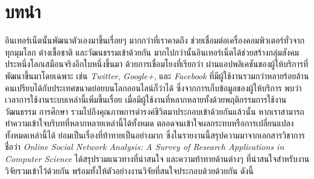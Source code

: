 \section{บทนำ}
อินเทอร์เน็ตนั้นพัฒนาตัวเองมาขึ้นเรื่อยๆ มากกว่าที่เราคาดถึง 
ช่วยเชื่อมต่อเครื่องคอมพิวเตอร์ทั่วจากทุกมุมโลก ต่างเชื้อชาติ และวัฒนธรรมเข้าด้วยกัน 
มากไปกว่านั้นอินเทอร์เน็ตได้ช่วยสร้างกลุ่มสังคมประหนึ่งโลกเสมือนจริงอีกใบหนึ่งขึ้นมา 
ด้วยการเชื่อมโยงที่เรียกว่า{\OSN} ผ่านแอปพลิเคชันของผู้ให้บริการที่พัฒนาขึ้นมาโดยเฉพาะ
เช่น \textit{Twitter}, \textit{Google+}, และ \textit{Facebook} 
ที่มีผู้ใช้งานรวมกว่าหลายร้อยล้านคนเปรียบได้กับประเทศขนาดย่อยบนโลกออนไลน์ก็ว่าได้ 
ซึ่งจากการเก็บข้อมูลของผู้ให้บริการ พบว่าเวลาการใช้งานระบบเหล่านี้เพิ่มขึ้นเรื่อย 
เมื่อมีผู้ใช้งานที่หลากหลายทั้งด้วยพฤติกรรมการใช้งาน วัฒนธรรม การศึกษา 
รวมไปถึงคุณภาพการดำรงค์ชีวิตมาประกอบเข้าด้วยกันแล้วนั้น 
หากเราสามารถทำความเข้าใจบริบทที่หลากหลายเหล่านี้ได้ทั้งหมด 
ตลอดจนเข้าใจผลกระทบหรือการเปลี่ยนแปลงทั้งหมดเหล่านี้ได้ ย่อมเป็นเรื่องที่ท้าทายเป็นอย่างมาก 
ซึ่งในรายงานนี้สรุปความมาจากเอกสารวิชาการชื่อว่า \textit{Online Social Network Analysis: A Survey of Research Applications in Computer Science} \cite{DBLP:journals/corr/KurkaGZ15}
ได้สรุปรวมแนวทางที่น่าสนใจ และความท้าทายด้านต่างๆ ที่น่าสนใจสำหรับงานวิจัยรวมเข้าไว้ด้วยกัน 
พร้อมทั้งให้ตัวอย่างงานวิจัยที่สนใจประกอบด้วยด้วยกัน ดังนี้
